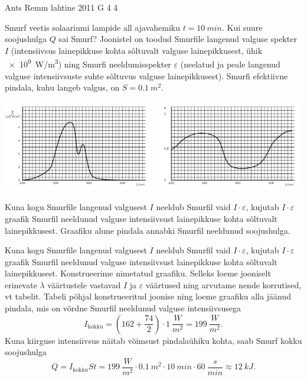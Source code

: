 {Ants Remm} %
{lahtine} %
{2011} %
{G 4} %
{4} %
{
\ifStatement
Smurf veetis solaariumi lampide all ajavahemiku $t = \SI{10}{min} $. Kui suure soojushulga $ Q $
sai Smurf? Joonistel on toodud Smurfile langenud valguse spekter $I$
(intensiivsus lainepikkuse kohta sõltuvalt valguse lainepikkusest, ühik
\SI{e9}{W/m^3}) ning Smurfi	
neeldumisspekter $\varepsilon$ (neelatud ja peale langenud valguse
intensiivsuste suhte
sõltuvus valguse lainepikkusest).
Smurfi efektiivne pindala, kuhu langeb valgus, on $ S = \SI{0,1}{m^2} $.
\begin{center}
\includegraphics[width=0.49\textwidth]{2011-lahg-04-I}
\includegraphics[width=0.49\textwidth]{2011-lahg-04-epsilon}
\end{center}
\fi


\ifHint
Kuna kogu Smurfile langenud valgusest $I$ neeldub Smurfil vaid $ I \cdot\varepsilon $, kujutab $ I \cdot \varepsilon $ graafik Smurfil neeldunud valguse intensiivsust lainepikkuse kohta sõltuvalt lainepikkusest. Graafiku alune pindala annabki Smurfil neeldunud soojushulga. 
\fi


\ifSolution
Kuna kogu Smurfile langenud valgusest $I$ neeldub Smurfil vaid $ I \cdot
\varepsilon $, kujutab $ I \cdot \varepsilon $ graafik Smurfil neeldunud valguse
intensiivsust lainepikkuse kohta sõltuvalt lainepikkusest. Konstrueerime
nimetatud graafiku. Selleks loeme jooniselt erinevate $ \lambda $ väärtustele
vastavad $ I $ ja $ \varepsilon $ väärtused ning arvutame nende korrutised, vt
tabelit. Tabeli põhjal konstrueeritud joonise ning loeme graafiku alla jäänud
pindala, mis on võrdne Smurfil neeldunud valguse intensiivsusega
\[
I_{\mathrm{kokku}} =
(162+\frac{74}{2}) \cdot \SI{1}{\frac{W}{m^2}} = \SI{199}{\frac{W}{m^2}}.
\]
Kuna kiirguse intensiivsus näitab võimsust pindalaühiku kohta, saab Smurf kokku soojushulga
\[ Q = I_{\mathrm{kokku}}St =
\SI{199}{\frac{W}{m^2}} \cdot \SI{0,1}{m^2} \cdot \SI{10}{min} \cdot
\SI{60}{\frac{s}{min}} \approx \SI{12}{kJ}.\]


}
